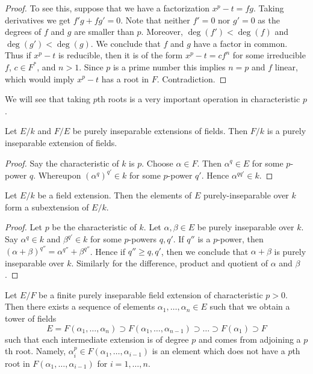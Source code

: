 \begin{proof}
To see this, suppose that we have a factorization
$x^p - t = f g$. Taking derivatives we get $f' g + f g' = 0$.
Note that neither $f' = 0$ nor $g' = 0$ as the degrees of $f$ and $g$
are smaller than $p$. Moreover, $\deg(f') < \deg(f)$ and $\deg(g') < \deg(g)$.
We conclude that $f$ and $g$ have a factor in common. Thus if $x^p - t$
is reducible, then it is of the form $x^p - t = c f^n$ for some irreducible
$f$, $c \in F^*$, and $n > 1$. Since $p$ is a prime number this
implies $n = p$ and $f$ linear, which would imply $x^p - t$ has a root
in $F$. Contradiction.
\end{proof}

\noindent
We will see that taking $p$th roots is a very important operation in
characteristic $p$.

\begin{lemma}
\label{lemma-purely-inseparable-permanence}
Let $E/k$ and $F/E$ be purely inseparable extensions of fields. Then $F/k$
is a purely inseparable extension of fields.
\end{lemma}

\begin{proof}
Say the characteristic of $k$ is $p$. Choose $\alpha \in F$. Then
$\alpha^q \in E$ for some $p$-power $q$. Whereupon $(\alpha^q)^{q'} \in k$
for some $p$-power $q'$. Hence $\alpha^{qq'} \in k$.
\end{proof}

\begin{lemma}
\label{lemma-purely-inseparable-elements}
Let $E/k$ be a field extension. Then the elements of $E$ purely-inseparable
over $k$ form a subextension of $E/k$.
\end{lemma}

\begin{proof}
Let $p$ be the characteristic of $k$.
Let $\alpha, \beta \in E$ be purely inseparable over $k$. Say
$\alpha^q \in k$ and $\beta^{q'} \in k$ for some $p$-powers $q, q'$.
If $q''$ is a $p$-power, then
$(\alpha + \beta)^{q''} = \alpha^{q''} + \beta^{q''}$.
Hence if $q'' \geq q, q'$, then we conclude that $\alpha + \beta$
is purely inseparable over $k$. Similarly for the difference,
product and quotient of $\alpha$ and $\beta$.
\end{proof}

\begin{lemma}
\label{lemma-finite-purely-inseparable}
Let $E/F$ be a finite purely inseparable field extension of
characteristic $p > 0$. Then there exists a sequence of elements
$\alpha_1, \ldots, \alpha_n \in E$ such that we obtain a tower
of fields
$$
E = F(\alpha_1, \ldots, \alpha_n) \supset
F(\alpha_1, \ldots, \alpha_{n - 1}) \supset
\ldots
\supset F(\alpha_1) \supset F
$$
such that each intermediate extension is of degree $p$ and comes
from adjoining a $p$th root. Namely,
$\alpha_i^p \in F(\alpha_1, \ldots, \alpha_{i - 1})$
is an element which does not have a $p$th root in
$F(\alpha_1, \ldots, \alpha_{i - 1})$ for $i = 1, \ldots, n$.
\end{lemma}


